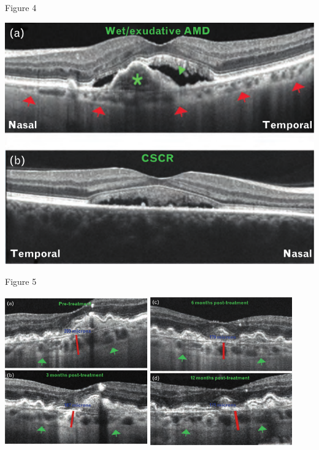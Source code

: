 \documentclass{beamer}
\begin{document}
\begin{frame}{Figure 4}
    \begin{center}
        \includegraphics[height=0.8\textheight]{4.png}
    \end{center}
\end{frame}

\begin{frame}{Figure 5}
    \begin{center}
        \includegraphics[width=0.46\textwidth]{5a.png}
        \quad
        \includegraphics[width=0.46\textwidth]{5c.png}
    \end{center}
\end{frame}
\end{document}
